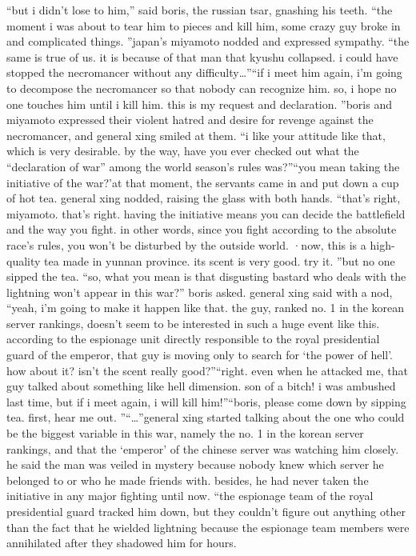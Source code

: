 “but i didn’t lose to him,” said boris, the russian tsar, gnashing his teeth.
 “the moment i was about to tear him to pieces and kill him, some crazy guy broke in and complicated things.
”japan’s miyamoto nodded and expressed sympathy.
“the same is true of us.
 it is because of that man that kyushu collapsed.
 i could have stopped the necromancer without any difficulty…”“if i meet him again, i’m going to decompose the necromancer so that nobody can recognize him.
 so, i hope no one touches him until i kill him.
 this is my request and declaration.
”boris and miyamoto expressed their violent hatred and desire for revenge against the necromancer, and general xing smiled at them.
“i like your attitude like that, which is very desirable.
 by the way, have you ever checked out what the “declaration of war” among the world season’s rules was?”“you mean taking the initiative of the war?’at that moment, the servants came in and put down a cup of hot tea.
general xing nodded, raising the glass with both hands.
“that’s right, miyamoto.
 that’s right.
 having the initiative means you can decide the battlefield and the way you fight.
 in other words, since you fight according to the absolute race’s rules, you won’t be disturbed by the outside world.
 ·now, this is a high-quality tea made in yunnan province.
 its scent is very good.
 try it.
”but no one sipped the tea.
“so, what you mean is that disgusting bastard who deals with the lightning won’t appear in this war?” boris asked.
general xing said with a nod, “yeah, i’m going to make it happen like that.
 the guy, ranked no.
 1 in the korean server rankings, doesn’t seem to be interested in such a huge event like this.
 according to the espionage unit directly responsible to the royal presidential guard of the emperor, that guy is moving only to search for ‘the power of hell’.
 how about it? isn’t the scent really good?”“right.
 even when he attacked me, that guy talked about something like hell dimension.
 son of a bitch! i was ambushed last time, but if i meet again, i will kill him!”“boris, please come down by sipping tea.
 first, hear me out.
”“…”general xing started talking about the one who could be the biggest variable in this war, namely the no.
 1 in the korean server rankings, and that the ‘emperor’ of the chinese server was watching him closely.
 he said the man was veiled in mystery because nobody knew which server he belonged to or who he made friends with.
 besides, he had never taken the initiative in any major fighting until now.
“the espionage team of the royal presidential guard tracked him down, but they couldn’t figure out anything other than the fact that he wielded lightning because the espionage team members were annihilated after they shadowed him for hours.
